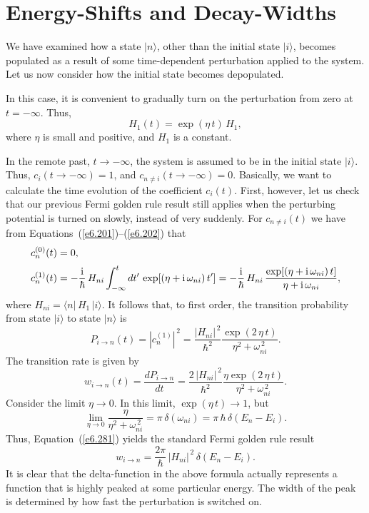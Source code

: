 \section{Energy-Shifts and Decay-Widths}\label{s6.18}
We have examined how a state $|n\rangle$, other than the initial
state $|i\rangle$, becomes populated as a result of some time-dependent
perturbation applied to the system. Let us now consider 
how the initial state becomes depopulated. 

In this case, it is convenient to gradually turn on the perturbation from zero at
 $t=-\infty$. Thus, 
\begin{equation}
H_1(t) = \exp(\eta\,t)\,H_1,
\end{equation}
where $\eta$ is small and positive, and $H_1$ is a constant. 

In the remote past, $t\rightarrow -\infty$, the system is assumed to
be in the initial state $|i\rangle$. Thus, $c_i(t\rightarrow-\infty) =1$,
and $c_{n\neq i}(t\rightarrow -\infty) = 0$. Basically, we want to
calculate the time evolution of the coefficient $c_i(t)$.
First, however, let us check that our previous Fermi golden rule result
still applies  when the perturbing potential is turned on slowly,
instead of very suddenly. For $c_{n \neq i}(t)$ we have from Equations~(\ref{e6.201})--(\ref{e6.202}) that
\begin{align}
c_n^{(0)}(t) &= 0,\\[0.5ex]
c_n^{(1)}(t) &= - \frac{\rm i}{\hbar}\, H_{ni} \int_{-\infty}^t dt'\,
\exp[(\eta + {\rm i}\,\omega_{ni} ) \,t']= -\frac{\rm i}{\hbar}\, H_{ni}\, \frac{
\exp[(\eta + {\rm i}\,\omega_{ni} )\, t]}{\eta +{\rm i}\,\omega_{ni}},
\end{align}
where $H_{ni} = \langle n|\,H_1\,|i\rangle$. 
It follows that, to first order, the transition probability from state $|i\rangle$ to state $|n\rangle$ is
\begin{equation}
P_{i\rightarrow n}(t) = |c_n^{(1)}|^{\,2} = \frac{|H_{ni}|^{\,2}}{\hbar^2}
\frac{\exp(2\, \eta\, t)}{\eta^2 + \omega_{ni}^{\,2}}.
\end{equation}
The transition rate is given by
\begin{equation}\label{e6.281}
w_{i\rightarrow n}(t) = \frac{dP_{i\rightarrow n}}{dt} = 
\frac{2 \,|H_{ni}|^{\,2}}{\hbar^2}
\frac{\eta \exp(2 \,\eta \,t)}{\eta^2 + \omega_{ni}^{\,2}}.
\end{equation}
Consider the limit $\eta\rightarrow 0$. In this limit,
$\exp(\eta\, t)\rightarrow 1$, but
\begin{equation}
\lim_{\eta\rightarrow 0} \frac{\eta}{\eta^2+ \omega_{ni}^{~2}}
=\pi\,\delta(\omega_{ni}) = \pi\,\hbar \,\delta(E_n - E_i).
\end{equation}
Thus, Equation~(\ref{e6.281}) yields the standard Fermi golden rule result
\begin{equation}
w_{i\rightarrow n} = \frac{2\pi}{\hbar} \,|H_{ni}|^{\,2} \,\delta(E_n - E_i).
\end{equation}
It is clear that the delta-function in the above formula actually represents
a function that  is highly peaked at some particular energy. The width
of the peak is determined by how fast the perturbation is switched on.

